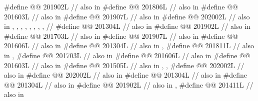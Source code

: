 \begin{codeblock}
#define @@                         201902L // also in 
#define @@                 201806L // also in 
#define @@           201603L // also in 
#define @@                            201907L // also in 
#define @@                          202002L
  // also in , , , , , , , ,
  // 
#define @@                 201304L // also in 
#define @@                         201902L // also in 
#define @@                        201703L // also in 
#define @@                            201907L // also in 
#define @@                           201606L // also in 
#define @@        201304L // also in , 
#define @@          201811L
  // also in , 
#define @@        201703L // also in 
#define @@ 201606L // also in 
#define @@                             201603L // also in 
#define @@     201505L
  // also in , , 
#define @@                          202002L // also in 
#define @@      202002L // also in 
#define @@                  201304L // also in 
#define @@        201304L // also in 
#define @@                       201902L // also in , 
#define @@                            201411L // also in 

\end{codeblock}
